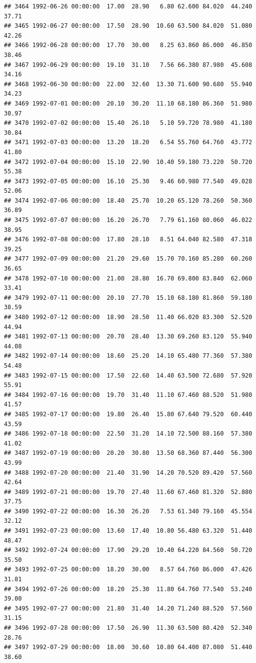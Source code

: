 \documentclass{article}\usepackage{graphicx, color}
\makeatletter
\newenvironment{kframe}{%
 \def\at@end@of@kframe{}%
 \ifinner\ifhmode%
  \def\at@end@of@kframe{\end{minipage}}%
  \begin{minipage}{\columnwidth}%
 \fi\fi%
 \def\FrameCommand##1{\hskip\@totalleftmargin \hskip-\fboxsep
 \colorbox{shadecolor}{##1}\hskip-\fboxsep
     \hskip-\linewidth \hskip-\@totalleftmargin \hskip\columnwidth}%
 \MakeFramed {\advance\hsize-\width
   \@totalleftmargin\z@ \linewidth\hsize
   \@setminipage}}%
 {\par\unskip\endMakeFramed%
 \at@end@of@kframe}
\newenvironment{knitrout}{}{} %
\makeatother
\begin{document}
\begin{knitrout}
\begin{kframe}
\begin{verbatim}
## 3464 1992-06-26 00:00:00  17.00  28.90   6.80 62.600 84.020  44.240  37.71
## 3465 1992-06-27 00:00:00  17.50  28.90  10.60 63.500 84.020  51.080  42.26
## 3466 1992-06-28 00:00:00  17.70  30.00   8.25 63.860 86.000  46.850  38.46
## 3467 1992-06-29 00:00:00  19.10  31.10   7.56 66.380 87.980  45.608  34.16
## 3468 1992-06-30 00:00:00  22.00  32.60  13.30 71.600 90.680  55.940  34.23
## 3469 1992-07-01 00:00:00  20.10  30.20  11.10 68.180 86.360  51.980  30.97
## 3470 1992-07-02 00:00:00  15.40  26.10   5.10 59.720 78.980  41.180  30.84
## 3471 1992-07-03 00:00:00  13.20  18.20   6.54 55.760 64.760  43.772  41.80
## 3472 1992-07-04 00:00:00  15.10  22.90  10.40 59.180 73.220  50.720  55.38
## 3473 1992-07-05 00:00:00  16.10  25.30   9.46 60.980 77.540  49.028  52.06
## 3474 1992-07-06 00:00:00  18.40  25.70  10.20 65.120 78.260  50.360  36.89
## 3475 1992-07-07 00:00:00  16.20  26.70   7.79 61.160 80.060  46.022  38.95
## 3476 1992-07-08 00:00:00  17.80  28.10   8.51 64.040 82.580  47.318  39.25
## 3477 1992-07-09 00:00:00  21.20  29.60  15.70 70.160 85.280  60.260  36.65
## 3478 1992-07-10 00:00:00  21.00  28.80  16.70 69.800 83.840  62.060  33.41
## 3479 1992-07-11 00:00:00  20.10  27.70  15.10 68.180 81.860  59.180  38.59
## 3480 1992-07-12 00:00:00  18.90  28.50  11.40 66.020 83.300  52.520  44.94
## 3481 1992-07-13 00:00:00  20.70  28.40  13.30 69.260 83.120  55.940  44.08
## 3482 1992-07-14 00:00:00  18.60  25.20  14.10 65.480 77.360  57.380  54.48
## 3483 1992-07-15 00:00:00  17.50  22.60  14.40 63.500 72.680  57.920  55.91
## 3484 1992-07-16 00:00:00  19.70  31.40  11.10 67.460 88.520  51.980  41.57
## 3485 1992-07-17 00:00:00  19.80  26.40  15.80 67.640 79.520  60.440  43.59
## 3486 1992-07-18 00:00:00  22.50  31.20  14.10 72.500 88.160  57.380  41.02
## 3487 1992-07-19 00:00:00  20.20  30.80  13.50 68.360 87.440  56.300  43.99
## 3488 1992-07-20 00:00:00  21.40  31.90  14.20 70.520 89.420  57.560  42.64
## 3489 1992-07-21 00:00:00  19.70  27.40  11.60 67.460 81.320  52.880  37.75
## 3490 1992-07-22 00:00:00  16.30  26.20   7.53 61.340 79.160  45.554  32.12
## 3491 1992-07-23 00:00:00  13.60  17.40  10.80 56.480 63.320  51.440  48.47
## 3492 1992-07-24 00:00:00  17.90  29.20  10.40 64.220 84.560  50.720  35.50
## 3493 1992-07-25 00:00:00  18.20  30.00   8.57 64.760 86.000  47.426  31.81
## 3494 1992-07-26 00:00:00  18.20  25.30  11.80 64.760 77.540  53.240  39.00
## 3495 1992-07-27 00:00:00  21.80  31.40  14.20 71.240 88.520  57.560  31.15
## 3496 1992-07-28 00:00:00  17.50  26.90  11.30 63.500 80.420  52.340  28.76
## 3497 1992-07-29 00:00:00  18.00  30.60  10.80 64.400 87.080  51.440  38.60

\end{verbatim}
\end{kframe}
\end{knitrout}
\end{document}
